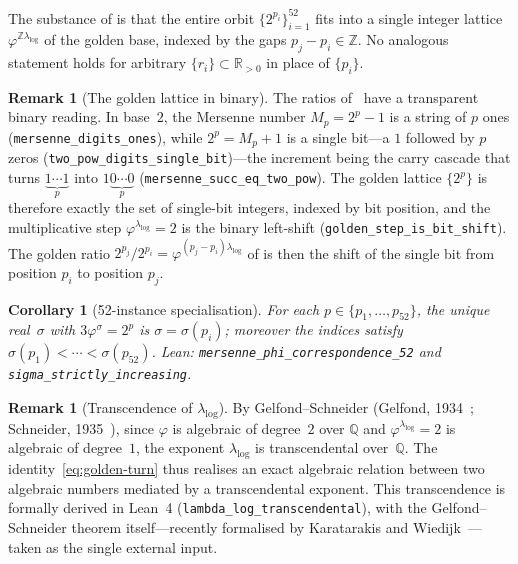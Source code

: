 \documentclass[11pt]{amsart}
\newtheorem{Corollary}[Theorem]{Corollary}
\theoremstyle{definition}
\newtheorem{Remark}[Theorem]{Remark}
\newcommand{\golden}{\varphi}
\newcommand{\Mp}{M_{p}}
\newcommand{\lean}[1]{\texttt{#1}}
\begin{document}
The substance of  is that the entire orbit
$\{2^{p_{i}}\}_{i=1}^{52}$ fits into a single integer lattice
$\golden^{\mathbb{Z}\lambda_{\log}}$ of the golden base, indexed by the
gaps $p_{j}-p_{i}\in\mathbb{Z}$.  No analogous statement holds for
arbitrary $\{r_{i}\}\subset\mathbb{R}_{>0}$ in place of $\{p_{i}\}$.

\begin{Remark}[The golden lattice in binary]\label{rem:binary}
The ratios of~ have a transparent binary reading.  In
base~$2$, the Mersenne number $\Mp=2^{p}-1$ is a string of $p$ ones
(\lean{mersenne\_digits\_ones}), while $2^{p}=\Mp+1$ is a single bit---a $1$
followed by $p$ zeros (\lean{two\_pow\_digits\_single\_bit})---the increment
being the carry cascade that turns $\underbrace{1\cdots1}_{p}$ into
$1\underbrace{0\cdots0}_{p}$ (\lean{mersenne\_succ\_eq\_two\_pow}).  The
golden lattice $\{2^{p}\}$ is therefore exactly the set of single-bit
integers, indexed by bit position, and the multiplicative step
$\golden^{\lambda_{\log}}=2$ is the binary left-shift
(\lean{golden\_step\_is\_bit\_shift}).  The golden ratio
$2^{p_{j}}/2^{p_{i}}=\golden^{(p_{j}-p_{i})\lambda_{\log}}$ of
 is then the shift of the single bit from position
$p_{i}$ to position $p_{j}$.
\end{Remark}

\begin{Corollary}[52-instance specialisation]\label{cor:51}
For each $p\in\{p_{1},\ldots,p_{52}\}$, the unique real~$\sigma$ with
$3\golden^{\sigma}=2^{p}$ is $\sigma=\sigma(p_{i})$; moreover the indices
satisfy $\sigma(p_{1})<\cdots<\sigma(p_{52})$.  Lean:
\lean{mersenne\_phi\_correspondence\_52} and
\lean{sigma\_strictly\_increasing}.
\end{Corollary}

\begin{Remark}[Transcendence of $\lambda_{\log}$]
\label{rem:transcendence}
By Gelfond--Schneider (Gelfond, 1934~\cite{gelfond}; Schneider,
1935~\cite{schneider}), since $\golden$ is algebraic of degree~$2$ over
$\mathbb{Q}$ and $\golden^{\lambda_{\log}}=2$ is algebraic of degree~$1$,
the exponent $\lambda_{\log}$ is transcendental over~$\mathbb{Q}$.  The
identity~\eqref{eq:golden-turn} thus realises an exact algebraic relation
between two algebraic numbers mediated by a transcendental exponent.  This transcendence is formally derived in
Lean~4 (\lean{lambda\_log\_transcendental}), with the Gelfond--Schneider
theorem itself---recently formalised by Karatarakis and Wiedijk~\cite{karatarakis-wiedijk}---taken as the single external
input.
\end{Remark}
\end{document}
